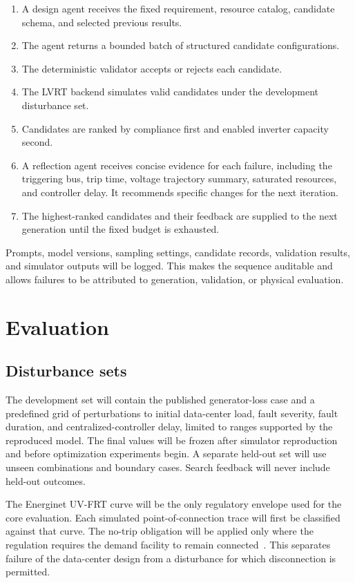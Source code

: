 \documentclass[11pt,a4paper]{article}
\begin{document}
\begin{enumerate}
    \item A design agent receives the fixed requirement, resource catalog, candidate schema, and selected previous results.
    \item The agent returns a bounded batch of structured candidate configurations.
    \item The deterministic validator accepts or rejects each candidate.
    \item The LVRT backend simulates valid candidates under the development disturbance set.
    \item Candidates are ranked by compliance first and enabled inverter capacity second.
    \item A reflection agent receives concise evidence for each failure, including the triggering bus, trip time, voltage trajectory summary, saturated resources, and controller delay. It recommends specific changes for the next iteration.
    \item The highest-ranked candidates and their feedback are supplied to the next generation until the fixed budget is exhausted.
\end{enumerate}

Prompts, model versions, sampling settings, candidate records, validation results, and simulator outputs will be logged. This makes the sequence auditable and allows failures to be attributed to generation, validation, or physical evaluation.

\section{Evaluation}

\subsection{Disturbance sets}

The development set will contain the published generator-loss case and a predefined grid of perturbations to initial data-center load, fault severity, fault duration, and centralized-controller delay, limited to ranges supported by the reproduced model. The final values will be frozen after simulator reproduction and before optimization experiments begin. A separate held-out set will use unseen combinations and boundary cases. Search feedback will never include held-out outcomes.

The Energinet UV-FRT curve will be the only regulatory envelope used for the core evaluation. Each simulated point-of-connection trace will first be classified against that curve. The no-trip obligation will be applied only where the regulation requires the demand facility to remain connected~\cite{energinet2024tr343}. This separates failure of the data-center design from a disturbance for which disconnection is permitted.
\end{document}
